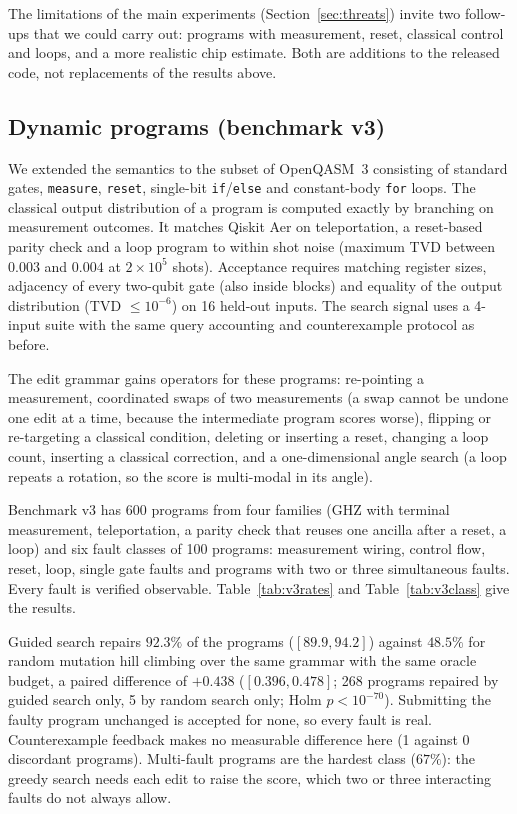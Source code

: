 \documentclass[journal]{IEEEtran}
\begin{document}
The limitations of the main experiments (Section~\ref{sec:threats}) invite two follow-ups that
we could carry out: programs with measurement, reset, classical control and loops, and a more
realistic chip estimate. Both are additions to the released code, not replacements of the
results above.

\subsection{Dynamic programs (benchmark v3)}

We extended the semantics to the subset of OpenQASM~3 consisting of standard gates,
\texttt{measure}, \texttt{reset}, single-bit \texttt{if}/\texttt{else} and constant-body
\texttt{for} loops. The classical output distribution of a program is computed exactly by
branching on measurement outcomes. It matches Qiskit Aer on teleportation, a reset-based
parity check and a loop program to within shot noise (maximum TVD between $0.003$ and $0.004$
at $2\times10^5$ shots). Acceptance requires matching register sizes, adjacency of every
two-qubit gate (also inside blocks) and equality of the output distribution (TVD $\le10^{-6}$)
on 16 held-out inputs. The search signal uses a 4-input suite with the same query accounting
and counterexample protocol as before.

The edit grammar gains operators for these programs: re-pointing a measurement, coordinated
swaps of two measurements (a swap cannot be undone one edit at a time, because the
intermediate program scores worse), flipping or re-targeting a classical condition,
deleting or inserting a reset, changing a loop count, inserting a classical correction, and a
one-dimensional angle search (a loop repeats a rotation, so the score is multi-modal in its
angle).

Benchmark v3 has 600 programs from four families (GHZ with terminal measurement,
teleportation, a parity check that reuses one ancilla after a reset, a loop) and six fault
classes of 100 programs: measurement wiring, control flow, reset, loop, single gate faults and
programs with two or three simultaneous faults. Every fault is verified observable.
Table~\ref{tab:v3rates} and Table~\ref{tab:v3class} give the results.





Guided search repairs $92.3\%$ of the programs ($[89.9,94.2]$) against $48.5\%$ for random
mutation hill climbing over the same grammar with the same oracle budget, a paired difference of
$+0.438$ ($[0.396,0.478]$; 268 programs repaired by guided search only, 5 by random search only;
Holm $p<10^{-70}$). Submitting the faulty program unchanged is accepted for none, so every
fault is real. Counterexample feedback makes no measurable difference here (1 against 0
discordant programs). Multi-fault programs are the hardest class ($67\%$): the greedy search
needs each edit to raise the score, which two or three interacting faults do not always allow.
\end{document}
